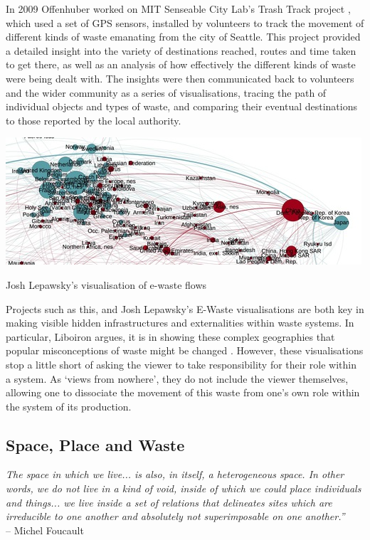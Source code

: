 \documentclass[nofonts,nols,justified,nobib]{tufte-book}
\begin{document}
In 2009 Offenhuber worked on MIT Senseable City Lab's Trash Track project \cite{ratti_trash_2009}, which used a set of GPS sensors, installed by volunteers to track the movement of different kinds of waste emanating from the city of Seattle. This project provided a detailed insight into the variety of destinations reached, routes and time taken to get there, as well as an analysis of how effectively the different kinds of waste were being dealt with. The insights were then communicated back to volunteers and the wider community as a series of visualisations, tracing the path of individual objects and types of waste, and comparing their eventual destinations to those reported by the local authority.

\begin{marginfigure}
\includegraphics[width=\textwidth]{img/1/lepwasky-ewaste-flows-2012.jpg}
\caption{Josh Lepawsky's visualisation of e-waste flows \label{b}}
\end{marginfigure}

Projects such as this, and Josh Lepawsky's E-Waste visualisations \cite{lepawsky_changing_2015} are both key in making visible hidden infrastructures and externalities within waste systems. In particular, Liboiron argues, it is in showing these complex geographies that popular misconceptions of waste might be changed \cite{liboiron_mapping_2014}. However, these visualisations stop a little short of asking the viewer to take responsibility for their role within a system. As `views from nowhere', they do not include the viewer themselves, allowing one to dissociate the movement of this waste from one's own role within the system of its production.

\subsection*{Space, Place and Waste}
\begin{flushright}
\emph{The space in which we live... is also, in itself, a heterogeneous space. In other words, we do not live in a kind of void, inside of which we could place individuals and things... we live inside a set of relations that delineates sites which are irreducible to one another and absolutely not superimposable on one another.''}\cite{foucault_other_1967}\\
-- Michel Foucault
\end{flushright}
\end{document}
